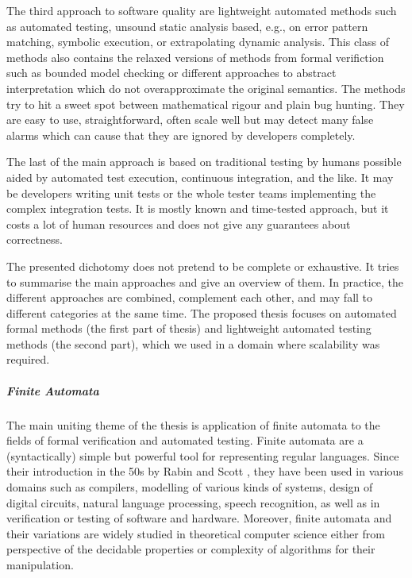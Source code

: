 The third approach to software quality are lightweight automated methods
such as automated testing, unsound static analysis based, e.g., on error pattern matching, symbolic execution,
or extrapolating dynamic analysis.
This class of methods also contains the relaxed versions of methods from formal verifiction
such as bounded model checking or different approaches to abstract interpretation which
do not overapproximate the original semantics.
The methods try to hit a sweet spot between mathematical rigour and plain bug hunting.
They are easy to use, straightforward, often scale well but may detect many false alarms which can cause
that they are ignored by developers completely.

The last of the main approach is based on traditional testing by humans possible aided
by automated test execution, continuous integration, and the like.
It may be developers writing unit tests or the whole tester teams implementing the complex integration tests.
It is mostly known and time-tested approach, but it costs a lot of human resources and
does not give any guarantees about correctness.

The presented dichotomy does not pretend to be complete or exhaustive.
It tries to summarise the main approaches and give an overview of them.
In practice, the different approaches are combined, complement each other, and may
fall to different categories at the same time.
The proposed thesis focuses on automated formal methods (the first part of thesis)
and lightweight automated testing methods (the second part), which we used in a domain where scalability was required.

\subparagraph{Finite Automata}
The main uniting theme of the thesis is application of finite automata to
the fields of formal verification and automated testing.
Finite automata are a (syntactically) simple but powerful tool for representing regular languages. 
Since their introduction in the 50s by Rabin and Scott \cite{rabin-scott}, they have been used in
various domains such as compilers, modelling of various kinds of systems,
design of digital circuits, natural language processing, speech recognition,
as well as in verification or testing of software and hardware.
Moreover, finite automata and their variations are widely studied in theoretical computer science either
from perspective of the decidable properties or complexity of algorithms for their manipulation.

